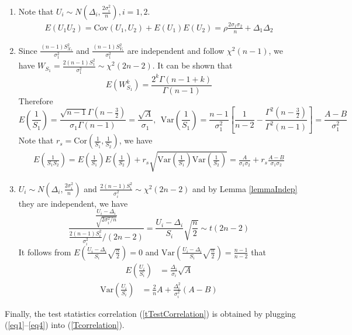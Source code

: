 \documentclass[12pt, a4paper]{article}
\begin{document}
	\begin{enumerate}
		\item Note that $U_i\sim N(\Delta_i, \frac{2\sigma_i^2}{n}),  i=1, 2$. 
		\begin{align}\label{eq1}
			E(U_1U_2)= \text{Cov}(U_1, U_2) + E(U_1)E(U_2) = \rho \frac{2\sigma_1\sigma_2}{n} +
			\Delta_1\Delta_2
		\end{align} 
		\item Since $\frac{(n-1)S_{X_1}^2}{\sigma_1^2}$ and $\frac{(n-1)S_{Y_1}^2}{\sigma_1^2}$ are
		independent  and follow $\chi^2(n-1)$, we have $W_{S_1}=\frac{2(n-1)S_1^2}{\sigma_1^2}\sim
		\chi^2(2n-2)$. It can be shown that 
		\[E(W_{S_1}^k)= \frac{2^k\Gamma(n-1+k)}{\Gamma(n-1)}\] 
		Therefore 
		\[E\left(\frac{1}{S_1}\right) =
		\frac{\sqrt{n-1}\Gamma(n-\frac{3}{2})}{\sigma_1\Gamma(n-1)}=\frac{\sqrt{A}}{\sigma_1}, 
		~~\text{Var}\left(\frac{1}{S_1}\right)=\frac{n-1}{\sigma_1^2}\left[\frac{1}{n-2} -
		\frac{\Gamma^2(n-\frac{3}{2})}{\Gamma^2(n-1)}\right]=\frac{A-B}{\sigma_1^2}\]
		Note that $r_s = \text{Cor}(\frac{1}{S_1}, \frac{1}{S_2})$, we have 
		\begin{align}\label{eq2}
			E(\frac{1}{S_1S_2})  = E(\frac{1}{S_1})E(\frac{1}{S_2}) + r_s
			\sqrt{\text{Var}(\frac{1}{S_1})\text{Var}(\frac{1}{S_2})} = \frac{A}{\sigma_1\sigma_2} + r_s
			\frac{A-B}{\sigma_1\sigma_2}
		\end{align}
		\item $U_i\sim N(\Delta_i, \frac{2\sigma_i^2}{n})$ and $\frac{2(n-1)S_i^2}{\sigma_i^2} \sim
		\chi^2(2n-2)$ and by Lemma \ref{lemmaIndep} they are independent, we have 
		\[\frac{\frac{U_i-\Delta_i}{\sqrt{2\sigma_i^2/n}}}{\frac{2(n-1)S_i^2}{\sigma_i^2}/(2n-2)}  =
		\frac{U_i-\Delta_i}{S_i}\sqrt{\frac{n}{2}}\sim t(2n-2)\]
		It follows from $E\left(\frac{U_i-\Delta_i}{S_i}\sqrt{\frac{n}{2}}\right)=0 $ and
		$\text{Var}\left(\frac{U_i-\Delta_i}{S_i}\sqrt{\frac{n}{2}}\right) = \frac{n-1}{n-2}$ that
		\begin{align}\label{eq3}
			E\left(\frac{U_i}{S_i}\right) &= \frac{\Delta_i}{\sigma_i}\sqrt{A}
		\end{align}
		\begin{align}\label{eq4}
			\text{Var}\left(\frac{U_i}{S_i}\right)&=\frac{2}{n}A + \frac{\Delta_i^2}{\sigma_i^2}(A-B)
		\end{align}
	\end{enumerate}
	Finally,  the test statistics correlation (\ref{tTestCorrelation}) is obtained by plugging
	(\ref{eq1}--\ref{eq4}) into (\ref{Tcorrelation}).
	
\end{document}
